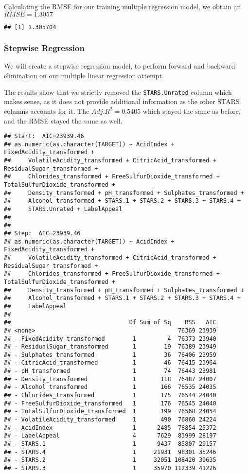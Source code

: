 \documentclass[
]{article}
\begin{document}
Calculating the RMSE for our training multiple regression model, we
obtain an \(RMSE = 1.3057\)

\begin{verbatim}
## [1] 1.305704
\end{verbatim}

\subsubsection{Stepwise Regression}\label{stepwise-regression}

We will create a stepwise regression model, to perform forward and
backward elimination on our multiple linear regression attempt.

The results show that we strictly removed the \texttt{STARS.Unrated}
column which makes sense, as it does not provide additional information
as the other STARS columns accounts for it. The \(Adj. R^2 = 0.5405\)
which stayed the same as before, and the RMSE stayed the same as well.

\begin{verbatim}
## Start:  AIC=23939.46
## as.numeric(as.character(TARGET)) ~ AcidIndex + FixedAcidity_transformed + 
##     VolatileAcidity_transformed + CitricAcid_transformed + ResidualSugar_transformed + 
##     Chlorides_transformed + FreeSulfurDioxide_transformed + TotalSulfurDioxide_transformed + 
##     Density_transformed + pH_transformed + Sulphates_transformed + 
##     Alcohol_transformed + STARS.1 + STARS.2 + STARS.3 + STARS.4 + 
##     STARS.Unrated + LabelAppeal
## 
## 
## Step:  AIC=23939.46
## as.numeric(as.character(TARGET)) ~ AcidIndex + FixedAcidity_transformed + 
##     VolatileAcidity_transformed + CitricAcid_transformed + ResidualSugar_transformed + 
##     Chlorides_transformed + FreeSulfurDioxide_transformed + TotalSulfurDioxide_transformed + 
##     Density_transformed + pH_transformed + Sulphates_transformed + 
##     Alcohol_transformed + STARS.1 + STARS.2 + STARS.3 + STARS.4 + 
##     LabelAppeal
## 
##                                  Df Sum of Sq    RSS   AIC
## <none>                                         76369 23939
## - FixedAcidity_transformed        1         4  76373 23940
## - ResidualSugar_transformed       1        19  76389 23949
## - Sulphates_transformed           1        36  76406 23959
## - CitricAcid_transformed          1        46  76415 23964
## - pH_transformed                  1        74  76443 23981
## - Density_transformed             1       118  76487 24007
## - Alcohol_transformed             1       166  76535 24035
## - Chlorides_transformed           1       175  76544 24040
## - FreeSulfurDioxide_transformed   1       176  76545 24040
## - TotalSulfurDioxide_transformed  1       199  76568 24054
## - VolatileAcidity_transformed     1       490  76860 24224
## - AcidIndex                       1      2485  78854 25372
## - LabelAppeal                     4      7629  83999 28197
## - STARS.1                         1      9437  85807 29157
## - STARS.4                         1     21931  98301 35246
## - STARS.2                         1     32051 108420 39635
## - STARS.3                         1     35970 112339 41226
\end{verbatim}
\end{document}
